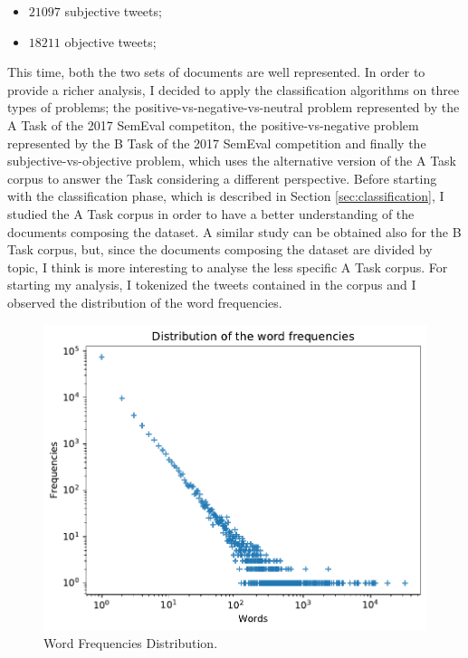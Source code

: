 \documentclass[11pt,twocolumn]{article}
\begin{document}
        \begin{itemize}
            \item $21097$ subjective tweets;
            \item $18211$ objective tweets;
        \end{itemize}

        \noindent
        This time, both the two sets of documents are well represented. In order to provide a richer
        analysis, I decided to apply the classification algorithms on three types of problems; the
        positive-vs-negative-vs-neutral problem represented by the A Task of the 2017 SemEval competiton, the
        positive-vs-negative problem represented by the B Task of the 2017 SemEval competition and finally the
        subjective-vs-objective problem, which uses the alternative version of the A Task corpus to answer the
        Task considering a different perspective. Before starting with the classification phase, which is
        described in Section \ref{sec:classification}, I studied the A Task corpus in order to have a better
        understanding of the documents composing the dataset. A similar study can be obtained also for the B Task
        corpus, but, since the documents composing the dataset are divided by topic, I think is more interesting
        to analyse the less specific A Task corpus. For starting my analysis, I tokenized the tweets contained in
        the corpus and I observed the distribution of the word frequencies.

        \begin{figure}[h]
            \centering
            \includegraphics[width=\linewidth]{../images/word_frequencies.pdf}
            \caption{Word Frequencies Distribution.}
            \label{fig:word_frequencies}
        \end{figure}
\end{document}

